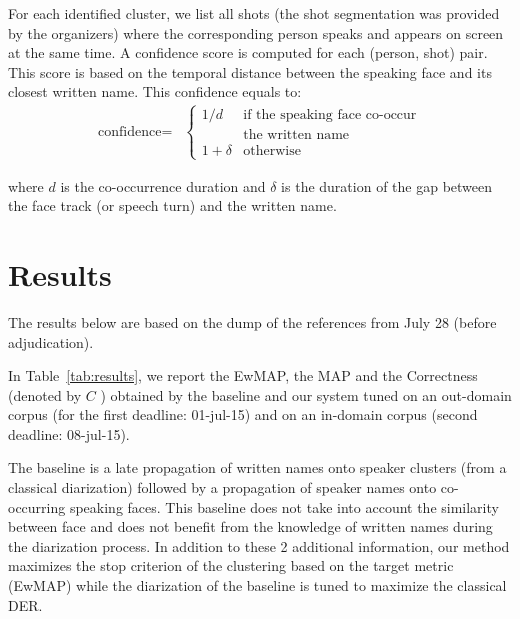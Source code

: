 \documentclass{acm_proc_article-me}
\begin{document}
For each identified cluster, we list all shots (the shot segmentation was provided by the organizers) where the corresponding person speaks and appears on screen at the same time. A confidence score is computed for each (person, shot) pair. This score is based on the temporal distance between the speaking face and its closest written name. This confidence equals to:
\begin{align*}
  \text{confidence} = & \left\{
  	\begin{array}{ll}
  		1/d  & \mbox{if the speaking face co-occur}  \\
  		 	 & \mbox{the written name}		\\
  		1+\delta &\mbox{otherwise}
  	\end{array}
  \right.
\end{align*}

\noindent where $d$ is the co-occurrence duration and $\delta$ is the duration of the gap between the face track (or speech turn) and the written name.

\section{Results}

The results below are based on the dump of the references from July 28 (before adjudication).

In Table~\ref{tab:results}, we report the EwMAP, the MAP and the Correctness (denoted by $C$ ) obtained by the baseline and our system tuned on an out-domain corpus (for the first deadline: 01-jul-15) and on an in-domain corpus (second deadline: 08-jul-15).

The baseline is a late propagation of written names onto speaker clusters (from a classical diarization) followed by a propagation of speaker names onto co-occurring speaking faces. This baseline does not take into account the similarity between face and does not benefit from the knowledge of written names during the diarization process. In addition to these 2 additional information, our method maximizes the stop criterion of the clustering based on the target metric (EwMAP) while the diarization of the baseline is tuned to maximize the classical DER.
\end{document}
